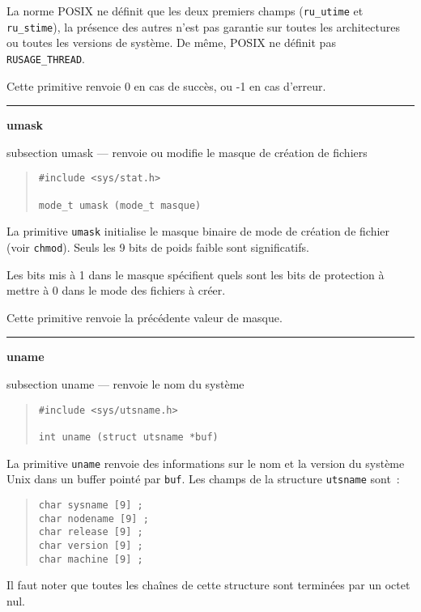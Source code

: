 \documentclass [twoside] {report}
\newcommand {\primitive} [1]
    {
	\phantomsection
	{\large \bf #1}
	\addcontentsline {toc} {subsection} {#1}
    }
\newcommand {\separation}
    {
	\vspace {5mm}
	\nopagebreak
	\hrule
    }
\begin{document}
La norme POSIX ne définit que les deux premiers champs (\texttt
{ru\_utime} et \texttt {ru\_stime}), la présence des autres n'est pas
garantie sur toutes les architectures ou toutes les versions de système.
De même, POSIX ne définit pas \texttt {RUSAGE\_THREAD}.

Cette primitive renvoie 0 en cas de succès, ou -1 en cas d'erreur.



\separation
\primitive {umask} --- renvoie ou modifie le masque de création de fichiers

\begin {quote}
\begin {verbatim}
#include <sys/stat.h>

mode_t umask (mode_t masque)
\end{verbatim}
\end {quote}

La primitive {\tt umask} initialise le masque
binaire de mode de création de fichier (voir {\tt chmod}).
Seuls les 9
bits de poids faible sont significatifs.

Les bits mis à 1 dans le masque spécifient quels
sont les bits de protection à mettre à 0 dans le
mode des fichiers à créer.

Cette primitive renvoie la précédente valeur de
masque.




\separation
\primitive {uname} --- renvoie le nom du système

\begin {quote}
\begin {verbatim}
#include <sys/utsname.h>

int uname (struct utsname *buf)
\end{verbatim}
\end {quote}

La primitive {\tt uname} renvoie des informations
sur le nom et la version du système Unix dans un
buffer pointé par {\tt buf}. Les champs de la
structure {\tt utsname} sont~:

\begin {quote}
\begin {verbatim}
char sysname [9] ;
char nodename [9] ;
char release [9] ;
char version [9] ;
char machine [9] ;
\end{verbatim}
\end {quote}

Il faut noter que toutes les chaînes de cette
structure sont terminées par un octet nul.
\end{document}
